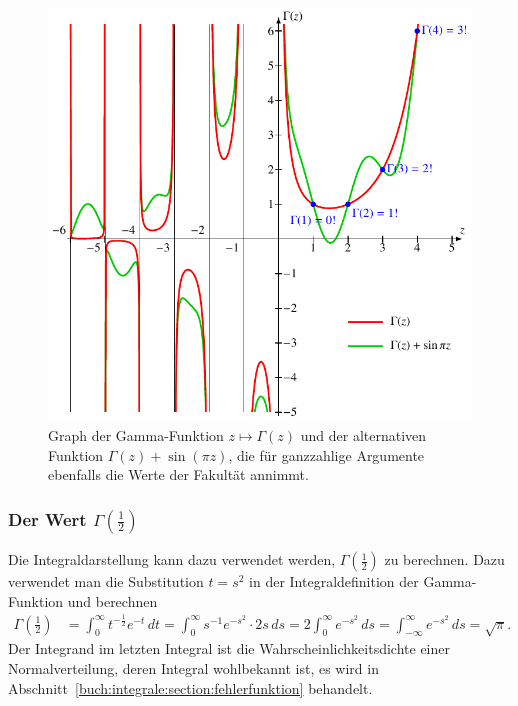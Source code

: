 \begin{figure}
\centering
\includegraphics{chapters/040-rekursion/images/gammaplot.pdf}
\caption{Graph der Gamma-Funktion $z\mapsto\Gamma(z)$ und der alternativen
Funktion $\Gamma(z)+\sin(\pi z)$, die für ganzzahlige Argumente ebenfalls
die Werte der Fakultät annimmt.
\label{buch:rekursion:fig:gamma}}
\end{figure}

%
%
\subsubsection{Der Wert $\Gamma(\frac12)$}
Die Integraldarstellung kann dazu verwendet werden, $\Gamma(\frac12)$ 
zu berechnen.
%
%
Dazu verwendet man die Substitution $t=s^2$ in der Integraldefinition
der Gamma-Funktion und berechnen
\begin{align}
\Gamma({\textstyle\frac12})
&=
\int_0^\infty t^{-\frac12} e^{-t}\,dt
=
\int_0^\infty s^{-1} e^{-s^2}\cdot 2s\,ds
=
2\int_0^\infty e^{-s^2}\,ds
=
\int_{-\infty}^\infty e^{-s^2}\,ds
=
\sqrt{\pi}.
\label{buch:rekursion:gamma:wert12}
\end{align}
Der Integrand im letzten Integral ist die Wahrscheinlichkeitsdichte
einer Normalverteilung, deren Integral wohlbekannt ist, es wird
in Abschnitt~\ref{buch:integrale:section:fehlerfunktion} behandelt.

